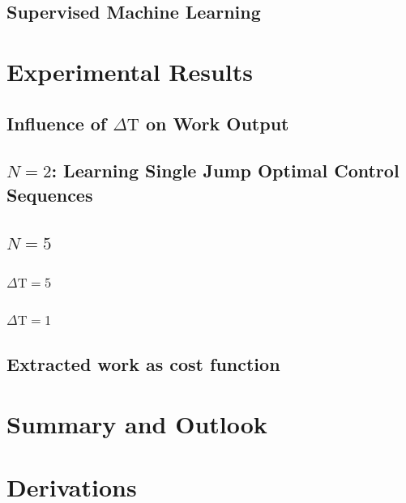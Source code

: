 %
\section{Supervised Machine Learning} \label{sml}



\chapter{Experimental Results}

\section{Influence of $\Delta \mathrm{T}$ on Work Output} \label{dep_dt}

\section{$N=2$: Learning Single Jump Optimal Control Sequences} \label{n_2_ml}

\section{$N=5$}\label{n5}
\subsection{$\Delta \mathrm{T} = 5$}\label{n_5_ml}



\subsection{$\Delta \mathrm{T} = 1$}\label{n_5_dt1}


\section{Extracted work as cost function}\label{work_cost}


\chapter{Summary and Outlook}\label{outlook}


\appendix
\chapter{Derivations}
